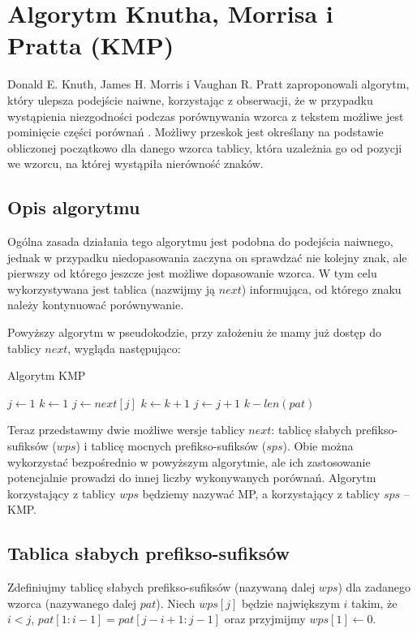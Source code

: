 \newpage
\section{Algorytm Knutha, Morrisa i Pratta (KMP)}
Donald E. Knuth, James H. Morris i Vaughan R. Pratt zaproponowali algorytm, który ulepsza podejście naiwne, korzystając z obserwacji, że w przypadku wystąpienia niezgodności podczas porównywania wzorca z tekstem możliwe jest pominięcie części porównań \cite{KMP}. Możliwy przeskok jest określany na podstawie obliczonej początkowo dla danego wzorca tablicy, która uzależnia go od pozycji we wzorcu, na której wystąpiła nierówność znaków.

\subsection{Opis algorytmu}
Ogólna zasada działania tego algorytmu jest podobna do podejścia naiwnego, jednak w przypadku niedopasowania zaczyna on sprawdzać nie kolejny znak, ale pierwszy od którego jeszcze jest możliwe dopasowanie wzorca. W tym celu wykorzystywana jest tablica (nazwijmy ją $next$) informująca, od którego znaku należy kontynuować porównywanie.

\noindent
Powyższy algorytm w pseudokodzie, przy założeniu że mamy już dostęp do tablicy $next$, wygląda następująco:
\begin{algorithm}
\caption{Algorytm KMP}\label{alg:kmp}
\begin{algorithmic}[1]
\State $j \gets 1$
\State $k \gets 1$
        \State $j \gets next[j]$
    \EndWhile
    \State $k \gets k + 1$
    \State $j \gets j + 1$
        \State \Return $k - len(pat)$
    \EndIf
\EndWhile
\end{algorithmic}
\end{algorithm}

Teraz przedstawmy dwie możliwe wersje tablicy $next$: tablicę słabych prefikso-sufiksów ($wps$) i tablicę mocnych prefikso-sufiksów ($sps$). Obie można wykorzystać bezpośrednio w powyższym algorytmie, ale ich zastosowanie potencjalnie prowadzi do innej liczby wykonywanych porównań. Algorytm korzystający z tablicy $wps$ będziemy nazywać MP, a korzystający z tablicy $sps$ -- KMP.

\subsection*{Tablica słabych prefikso-sufiksów}
Zdefiniujmy tablicę słabych prefikso-sufiksów (nazywaną dalej $wps$) dla zadanego wzorca (nazywanego dalej $pat$). Niech $wps[j]$ będzie największym $i$ takim, że $i < j$, $pat[1:i-1] = pat[j-i+1:j-1]$ oraz przyjmijmy $wps[1] \gets 0$.

